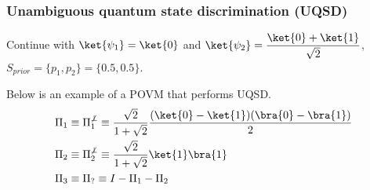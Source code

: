 \documentclass{beamer}
\begin{document}
\begin{frame}
    \frametitle{Unambiguous quantum state discrimination (UQSD)}
    Continue with $\ket{\psi_{1}} = \ket{0}$ and
    $\ket{\psi_{2}} = \dfrac{\ket{0}+\ket{1}}{\sqrt{2}}$,
    $S_{prior} = \{p_{1}, p_{2}\} = \{0.5, 0.5\}$.
    \vspace*{0.2cm}

    Below is an example of a POVM that performs UQSD.
    \begin{align}
         & \Pi_{1} \equiv \Pi_{1}^{\not\perp} \equiv \frac{\sqrt{2}}{1 + \sqrt{2}}
        \frac{(\ket{0} - \ket{1})(\bra{0} - \bra{1})}{2}                                          \\
         & \Pi_{2} \equiv \Pi_{2}^{\not\perp} \equiv \frac{\sqrt{2}}{1 + \sqrt{2}} \ket{1}\bra{1} \\
         & \Pi_{3} \equiv \Pi_{?} \equiv I - \Pi_{1} - \Pi_{2}
    \end{align}
\end{frame}
\end{document}

